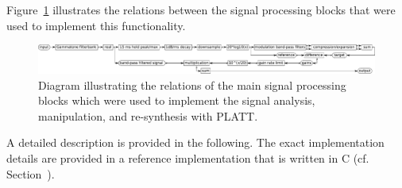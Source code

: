 \documentclass[10pt,a4paper,twocolumn]{article}
\begin{document}
Figure~\ref{fig:5} illustrates the relations between the signal processing blocks that were used to implement this functionality.
%
\begin{figure}
	\centerline{\includegraphics[width=1.0\textwidth]{images/platt-diagramm}}
	\caption{Diagram illustrating the relations of the main signal processing blocks which were used to implement the signal analysis, manipulation, and re-synthesis with PLATT.}
	\label{fig:5}
\end{figure}
%
A detailed description is provided in the following.
%
The exact implementation details are provided in a reference implementation that is written in C (cf. Section~).
\end{document}
